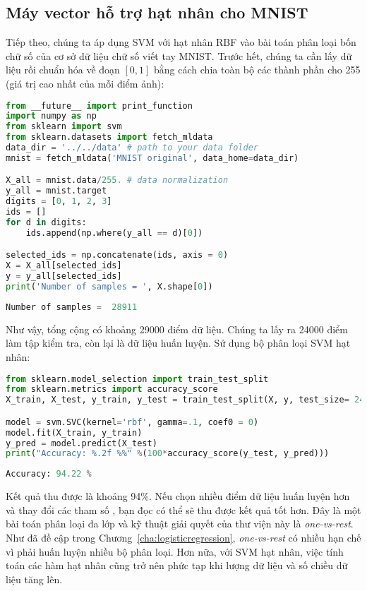  
 
\subsection{Máy vector hỗ trợ hạt nhân cho MNIST}
Tiếp theo, chúng ta áp dụng SVM với hạt nhân RBF vào bài toán phân loại bốn chữ số  của cơ sở dữ liệu chữ số viết tay MNIST.
Trước hết, chúng ta cần lấy dữ liệu rồi chuẩn hóa về đoạn $[0, 1]$ bằng cách chia toàn bộ các thành phần cho 255 (giá trị cao
nhất của mỗi điểm ảnh): 
\begin{lstlisting}[language=Python]
from __future__ import print_function 
import numpy as np 
from sklearn import svm
from sklearn.datasets import fetch_mldata
data_dir = '../../data' # path to your data folder 
mnist = fetch_mldata('MNIST original', data_home=data_dir)

X_all = mnist.data/255. # data normalization 
y_all = mnist.target 
digits = [0, 1, 2, 3]
ids = []
for d in digits:
    ids.append(np.where(y_all == d)[0])

selected_ids = np.concatenate(ids, axis = 0)
X = X_all[selected_ids]
y = y_all[selected_ids]
print('Number of samples = ', X.shape[0])
\end{lstlisting}
\kq 
\begin{lstlisting}[language=Python]
Number of samples =  28911
\end{lstlisting}
Như vậy, tổng cộng có khoảng 29000 điểm dữ liệu. Chúng ta lấy ra 24000
điểm làm tập kiểm tra, còn lại là dữ liệu huấn luyện. Sử dụng bộ phân loại SVM hạt nhân:
\begin{lstlisting}[language=Python]
from sklearn.model_selection import train_test_split
from sklearn.metrics import accuracy_score
X_train, X_test, y_train, y_test = train_test_split(X, y, test_size= 24000)

model = svm.SVC(kernel='rbf', gamma=.1, coef0 = 0)
model.fit(X_train, y_train)
y_pred = model.predict(X_test) 
print("Accuracy: %.2f %%" %(100*accuracy_score(y_test, y_pred))) 
\end{lstlisting}
\kq 
\begin{lstlisting}[language=Python]
Accuracy: 94.22 %
\end{lstlisting}
Kết quả thu được là khoảng 94\%. Nếu chọn nhiều điểm dữ liệu huấn luyện hơn và
thay đổi các tham số , bạn đọc có thể sẽ thu được
kết quả tốt hơn. Đây là một bài toán phân loại đa lớp và
kỹ thuật giải quyết của thư viện này là \textit{one-vs-rest}. Như đã đề cập trong
Chương~\ref{cha:logisticregression}, \textit{one-vs-rest} có nhiều hạn chế vì
phải huấn luyện nhiều bộ phân loại. Hơn nữa, với SVM hạt nhân, việc tính toán các
hàm hạt nhân cũng trở nên phức tạp khi lượng dữ liệu và số chiều dữ liệu tăng lên.


